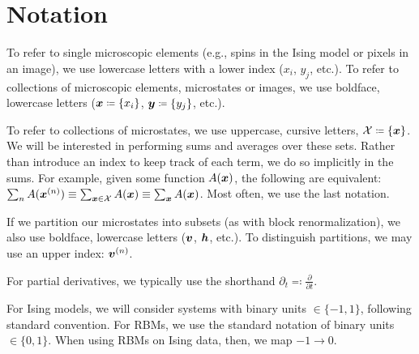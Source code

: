 \section{Notation}
To refer to single microscopic elements (e.g., spins in the Ising
model or pixels in an image), we use lowercase letters with a lower
index ($x_i$, $y_j$, etc.).  To refer to collections of microscopic
elements, microstates or images, we use boldface, lowercase letters
($\bx\eqcolon\setx$, $\by\eqcolon\sety$, etc.).

To refer to collections of microstates, we use uppercase, cursive
letters, $\mcX\eqcolon\{\bx\}$. We will be interested in performing
sums and averages over these sets. Rather than introduce an index to
keep track of each term, we do so implicitly in the sums.  For
example, given some function $A(\boldsymbol{x})$, the following are equivalent:
$\sum_{n}A(\boldsymbol{x}^{(n)})\equiv\sum_{\boldsymbol{x}\in \mathcal{X}}A(\boldsymbol{x})\equiv\sum_{\boldsymbol{x}}
A(\boldsymbol{x})$. Most often, we use the last notation.

If we partition our microstates into subsets (as with block
renormalization), we also use boldface, lowercase letters ($\boldsymbol{v}$,
$\boldsymbol{h}$, etc.). To distinguish partitions, we may use an upper index:
$\boldsymbol{v}^{(n)}$.

For partial derivatives, we typically use the shorthand
$\partial_t\eqcolon\frac{\partial}{\partial t}$.

For Ising models, we will consider systems with binary units
$\in \{-1,1\}$, following standard convention. For RBMs, we use the
standard notation of binary units $\in \{0,1\}$. When using RBMs on
Ising data, then, we map $-1\rightarrow0$.
